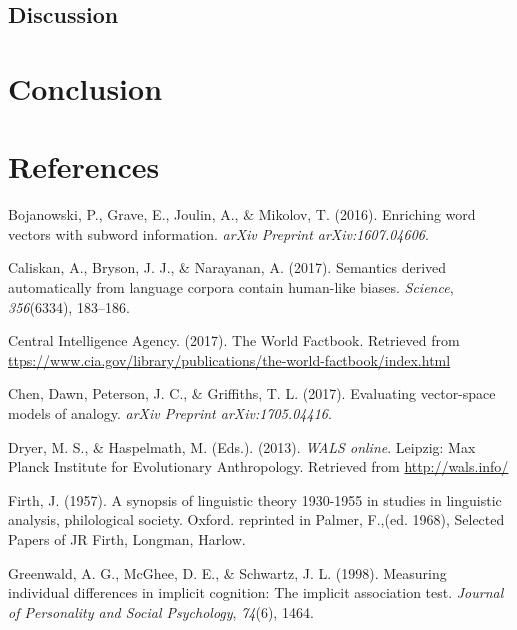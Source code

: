 \documentclass[10pt, letterpaper]{article}
\begin{document}
\subsection{Discussion}\label{discussion-2}

\section{Conclusion}\label{conclusion}

\section{References}\label{references}

\setlength{\parindent}{-0.1in} \setlength{\leftskip}{0.125in} \noindent

\hypertarget{refs}{}
\hypertarget{ref-bojanowski2016enriching}{}
Bojanowski, P., Grave, E., Joulin, A., \& Mikolov, T. (2016). Enriching
word vectors with subword information. \emph{arXiv Preprint
arXiv:1607.04606}.

\hypertarget{ref-caliskan2017semantics}{}
Caliskan, A., Bryson, J. J., \& Narayanan, A. (2017). Semantics derived
automatically from language corpora contain human-like biases.
\emph{Science}, \emph{356}(6334), 183--186.

\hypertarget{ref-ciafactbook}{}
Central Intelligence Agency. (2017). The World Factbook. Retrieved from
\url{ttps://www.cia.gov/library/publications/the-world-factbook/index.html}

\hypertarget{ref-chen2017evaluating}{}
Chen, Dawn, Peterson, J. C., \& Griffiths, T. L. (2017). Evaluating
vector-space models of analogy. \emph{arXiv Preprint arXiv:1705.04416}.

\hypertarget{ref-wals}{}
Dryer, M. S., \& Haspelmath, M. (Eds.). (2013). \emph{WALS online}.
Leipzig: Max Planck Institute for Evolutionary Anthropology. Retrieved
from \url{http://wals.info/}

\hypertarget{ref-firth1957synopsis}{}
Firth, J. (1957). A synopsis of linguistic theory 1930-1955 in studies
in linguistic analysis, philological society. Oxford. reprinted in
Palmer, F.,(ed. 1968), Selected Papers of JR Firth, Longman, Harlow.

\hypertarget{ref-greenwald1998measuring}{}
Greenwald, A. G., McGhee, D. E., \& Schwartz, J. L. (1998). Measuring
individual differences in implicit cognition: The implicit association
test. \emph{Journal of Personality and Social Psychology}, \emph{74}(6),
1464.
\end{document}
